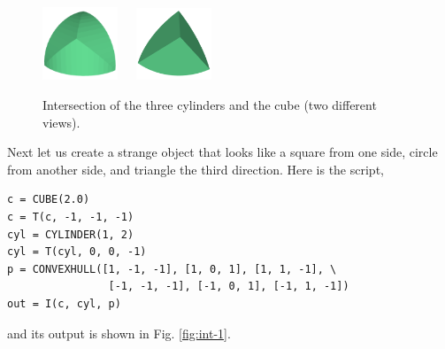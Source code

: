 \begin{figure}[!ht]
\begin{center}
\includegraphics[width=0.2\textwidth]{img/int-2a.png}\ \ \ 
\includegraphics[width=0.2\textwidth]{img/int-2b.png}
\end{center}
\vspace{-4mm}
\caption{Intersection of the three cylinders and the cube (two different views).}
\label{fig:int-2}
\end{figure}
\noindent
Next let us create 
a strange object that looks like a square from one side,
circle from another side, and triangle the third direction. 
Here is the script,\\

\begin{bbox}
\begin{verbatim}
c = CUBE(2.0)
c = T(c, -1, -1, -1)
cyl = CYLINDER(1, 2)
cyl = T(cyl, 0, 0, -1)
p = CONVEXHULL([1, -1, -1], [1, 0, 1], [1, 1, -1], \
                [-1, -1, -1], [-1, 0, 1], [-1, 1, -1])
out = I(c, cyl, p)
\end{verbatim}
\end{bbox}
\vspace{6mm}

\noindent
and its output is shown in Fig. \ref{fig:int-1}.\\

